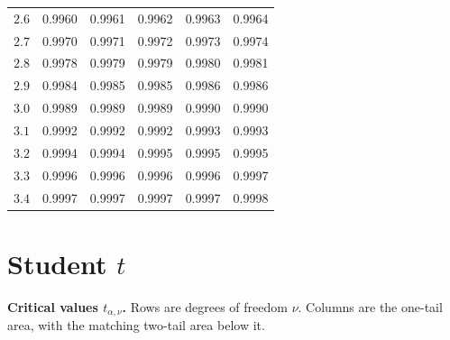 \begin{center}
\begin{tabular}{c|ccccc}
$2.6$ & 0.9960 & 0.9961 & 0.9962 & 0.9963 & 0.9964 \\
$2.7$ & 0.9970 & 0.9971 & 0.9972 & 0.9973 & 0.9974 \\
$2.8$ & 0.9978 & 0.9979 & 0.9979 & 0.9980 & 0.9981 \\
$2.9$ & 0.9984 & 0.9985 & 0.9985 & 0.9986 & 0.9986 \\
$3.0$ & 0.9989 & 0.9989 & 0.9989 & 0.9990 & 0.9990 \\
$3.1$ & 0.9992 & 0.9992 & 0.9992 & 0.9993 & 0.9993 \\
$3.2$ & 0.9994 & 0.9994 & 0.9995 & 0.9995 & 0.9995 \\
$3.3$ & 0.9996 & 0.9996 & 0.9996 & 0.9996 & 0.9997 \\
$3.4$ & 0.9997 & 0.9997 & 0.9997 & 0.9997 & 0.9998 \\
\bottomrule
\end{tabular}
\end{center}

\section{Student $t$}

\textbf{Critical values $t_{\alpha,\nu}$.} Rows are degrees of freedom $\nu$. Columns are the one-tail area, with the matching two-tail area below it.

